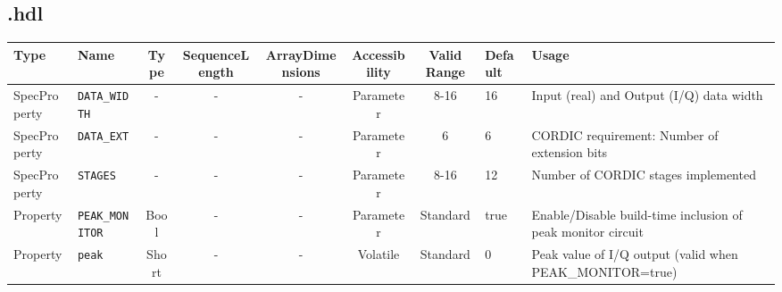 \begin{landscape}
\subsection*{\comp.hdl}
\begin{scriptsize}
	\begin{tabular}{|p{3cm}|p{2cm}|c|c|c|c|c|p{1cm}|p{6cm}|}
		\hline
		\rowcolor{blue}
		Type         & Name              & Type & SequenceLength & ArrayDimensions & Accessibility & Valid Range & Default & Usage                                    \\
		\hline
		SpecProperty & \verb+DATA_WIDTH+ & -    & -              & -               & Parameter     & 8-16        & 16      & Input (real) and Output (I/Q) data width \\
		\hline
		SpecProperty & \verb+DATA_EXT+   & -    & -              & -               & Parameter     & 6           & 6       & CORDIC requirement: Number of extension bits \\
		\hline
		SpecProperty & \verb+STAGES+     & -    & -              & -               & Parameter     & 8-16        & 12      & Number of CORDIC stages implemented      \\
		\hline
		Property & \verb+PEAK_MONITOR+     & Bool    & -              & -               & Parameter     & Standard        & true      & Enable/Disable build-time inclusion of peak monitor circuit\\
		\hline
		Property & \verb+peak+     & Short & -              & -               & Volatile & Standard        & 0 & Peak value of I/Q output (valid when PEAK\_MONITOR=true)\\
		\hline
	\end{tabular}
\end{scriptsize}

\end{landscape}
